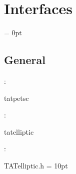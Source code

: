 
\section{Interfaces} 


\parskip = 0pt

\vspace{3mm} \subsection*{General}

: 

tatpetsc
\vspace{2mm}

: 

tatelliptic
\vspace{2mm}

\vspace{5mm}

: 

TATelliptic.h
\vspace{2mm}\parskip = 10pt 

